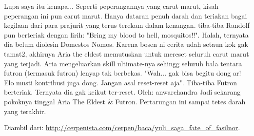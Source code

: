 \documentclass[a4paper,11pt,final]{article}
\begin{document}
Lupa saya itu kenapa...
Seperti peperangannya yang carut marut, kisah peperangan ini pun carut marut. Hanya dataran penuh darah dan teriakan bagai kegilaan dari para prajurit yang terus terekam dalam kenangan.
tiba-tiba Randolf pun berteriak dengan lirih: "Bring my blood to hell, mosquitos!!". Halah, ternyata dia belum diolesin Domestos Nomos.
Karena bosen ni cerita udah setaun kok gak tamat2, akhirnya Aria the eldest memutuskan untuk mereset seluruh carut marut yang terjadi. Aria mengeluarkan skill ultimate-nya sehingg seluruh bala tentara futron (termasuk futron) lenyap tak berbekas.
"Wah... gak bisa begitu dong ar! Elo musti kontribusi juga dong. Jangan asal reset-reset aja". Tiba-tiba Futron berteriak. Ternyata dia gak keikut ter-reset.
Oleh: anwarchandra
Jadi sekarang pokoknya tinggal Aria The Eldest \& Futron. Pertarungan ini sampai tetes darah yang terakhir.

Diambil dari: \url{http://cerpenista.com/cerpen/baca/yuli\_saga\_fate\_of\_fasilnor}. 

\printindex
\end{document}
